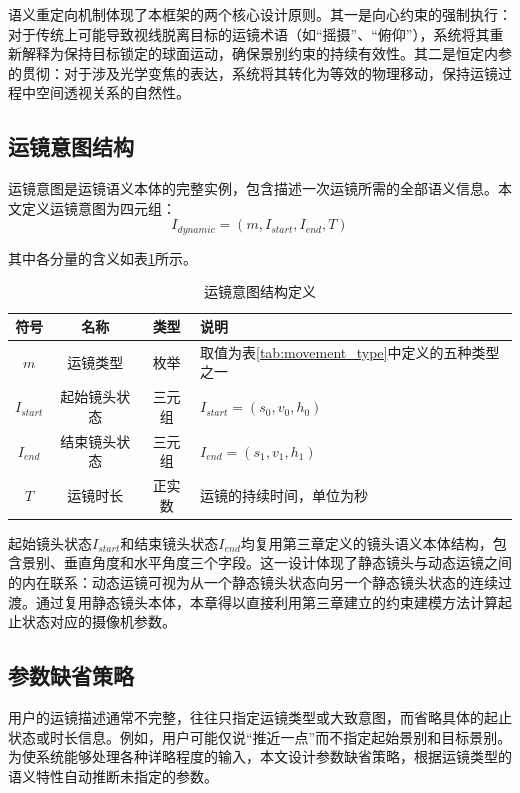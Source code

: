 语义重定向机制体现了本框架的两个核心设计原则。其一是向心约束的强制执行：对于传统上可能导致视线脱离目标的运镜术语（如“摇摄”、“俯仰”），系统将其重新解释为保持目标锁定的球面运动，确保景别约束的持续有效性。其二是恒定内参的贯彻：对于涉及光学变焦的表达，系统将其转化为等效的物理移动，保持运镜过程中空间透视关系的自然性。

\subsection{运镜意图结构}

运镜意图是运镜语义本体的完整实例，包含描述一次运镜所需的全部语义信息。本文定义运镜意图为四元组：
\begin{equation}
I_{dynamic} = (m, I_{start}, I_{end}, T)
\label{eq:dynamic_intent}
\end{equation}

其中各分量的含义如表\ref{tab:dynamic_intent}所示。

\begin{table}[htbp]
\centering
\caption{运镜意图结构定义}
\label{tab:dynamic_intent}
\begin{tabular}{cccp{6.5cm}}
\toprule
符号 & 名称 & 类型 & 说明 \\
\midrule
$m$ & 运镜类型 & 枚举 & 取值为表\ref{tab:movement_type}中定义的五种类型之一 \\
$I_{start}$ & 起始镜头状态 & 三元组 & $I_{start} = (s_0, v_0, h_0)$\\
$I_{end}$ & 结束镜头状态 & 三元组 & $I_{end} = (s_1, v_1, h_1)$\\
$T$ & 运镜时长 & 正实数 & 运镜的持续时间，单位为秒 \\
\bottomrule
\end{tabular}
\end{table}

起始镜头状态$I_{start}$和结束镜头状态$I_{end}$均复用第三章定义的镜头语义本体结构，包含景别、垂直角度和水平角度三个字段。这一设计体现了静态镜头与动态运镜之间的内在联系：动态运镜可视为从一个静态镜头状态向另一个静态镜头状态的连续过渡。通过复用静态镜头本体，本章得以直接利用第三章建立的约束建模方法计算起止状态对应的摄像机参数。

\subsection{参数缺省策略}

用户的运镜描述通常不完整，往往只指定运镜类型或大致意图，而省略具体的起止状态或时长信息。例如，用户可能仅说“推近一点”而不指定起始景别和目标景别。为使系统能够处理各种详略程度的输入，本文设计参数缺省策略，根据运镜类型的语义特性自动推断未指定的参数。

